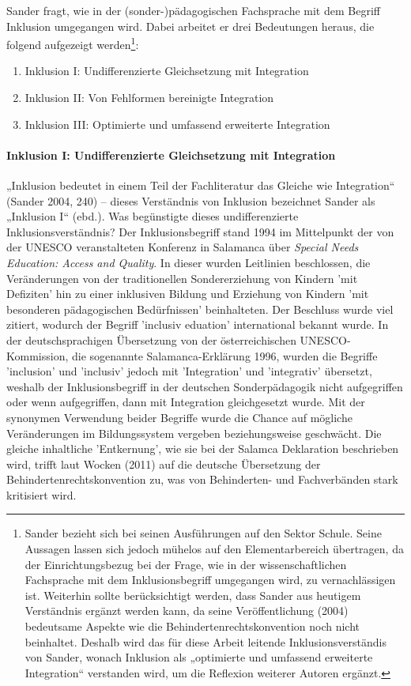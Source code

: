 Sander fragt, wie in der (sonder-)pädagogischen Fachsprache mit dem Begriff Inklusion umgegangen wird. Dabei arbeitet er drei Bedeutungen heraus, die folgend aufgezeigt werden\footnote{Sander bezieht sich bei seinen Ausführungen auf den Sektor Schule. Seine Aussagen lassen sich jedoch mühelos auf den Elementarbereich übertragen, da der Einrichtungsbezug bei der Frage, wie in der wissenschaftlichen Fachsprache mit dem Inklusionsbegriff umgegangen wird, zu vernachlässigen ist.  
Weiterhin sollte berücksichtigt werden, dass Sander aus heutigem Verständnis ergänzt werden kann, da seine Veröffentlichung (2004) bedeutsame Aspekte wie die Behindertenrechtskonvention noch nicht beinhaltet. Deshalb wird das für diese Arbeit leitende Inklusionsverständis von Sander, wonach Inklusion als „optimierte und umfassend erweiterte Integration“ verstanden wird, um die Reflexion weiterer Autoren ergänzt.}: 
\begin{enumerate}
\item Inklusion I: Undifferenzierte Gleichsetzung mit Integration
\item Inklusion II: Von Fehlformen bereinigte Integration
\item Inklusion III: Optimierte und umfassend erweiterte Integration
\end{enumerate}  
  
\paragraph{Inklusion I: Undifferenzierte Gleichsetzung mit Integration}
„Inklusion bedeutet in einem Teil der Fachliteratur das Gleiche wie Integration“ (Sander 2004, 240) -- dieses Verständnis von Inklusion bezeichnet Sander als „Inklusion I“ (ebd.). 
Was begünstigte dieses undifferenzierte Inklusionsverständnis? 
Der Inklusionsbegriff stand 1994 im Mittelpunkt der von der UNESCO veranstalteten Konferenz in Salamanca über \emph{Special Needs Education: Access and Quality}. In dieser wurden Leitlinien beschlossen, die Veränderungen von der traditionellen Sondererziehung von Kindern 'mit Defiziten' hin zu einer inklusiven Bildung und Erziehung von Kindern 'mit besonderen pädagogischen Bedürfnissen' beinhalteten. Der Beschluss wurde viel zitiert, wodurch der Begriff 'inclusiv eduation' international bekannt wurde. 
In der deutschsprachigen Übersetzung von der österreichischen UNESCO-Kommission, die sogenannte Salamanca-Erklärung 1996, wurden die Begriffe 'inclusion' und 'inclusiv' jedoch mit 'Integration' und 'integrativ' übersetzt, weshalb der Inklusionsbegriff in der deutschen Sonderpädagogik nicht aufgegriffen oder wenn aufgegriffen, dann mit Integration gleichgesetzt wurde. Mit der synonymen Verwendung beider Begriffe wurde die Chance auf mögliche Veränderungen im Bildungssystem vergeben beziehungsweise geschwächt. Die gleiche inhaltliche 'Entkernung', wie sie bei der Salamca Deklaration beschrieben wird, trifft laut Wocken (2011) auf die deutsche Übersetzung der Behindertenrechtskonvention zu, was von Behinderten- und Fachverbänden stark kritisiert wird.
  
